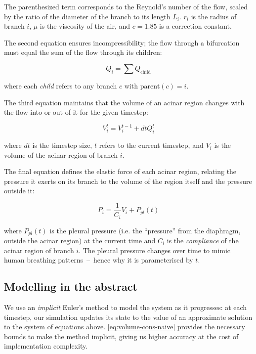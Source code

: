 The parenthesized term corresponds to the Reynold's number of the flow, scaled by the ratio of the
diameter of the branch to its length $L_i$. $r_i$ is the radius of branch $i$, $\mu$ is the
viscosity of the air, and $c = 1.85$ is a correction constant.

The second equation ensures incompressibility; the flow through a bifurcation must equal the sum of
the flow through its children:

\begin{equation}
    Q_i = \sum Q_{\text{child}}
\end{equation}

\noindent
where each \textit{child} refers to any branch $c$ with $\text{parent}(c) = i$.

The third equation maintains that the volume of an acinar region changes with the flow into or out
of it for the given timestep:

\begin{equation}
    V_i^t = V_i^{t-1} + dt Q_i^t
\end{equation}

\noindent
where $dt$ is the timestep size, $t$ refers to the current timestep, and $V_i$ is the volume of the
acinar region of branch $i$.

The final equation defines the elastic force of each acinar region, relating the pressure it exerts
on its branch to the volume of the region itself and the pressure outside it:

\begin{equation} \label{eq:volume-cons-naive}
    P_i = \frac{1}{C_i} V_i + P_{pl}(t)
\end{equation}

\noindent
where $P_{pl}(t)$ is the pleural pressure (i.e. the ``pressure'' from the diaphragm, outside the
acinar region) at the current time and $C_i$ is the \textit{compliance} of the acinar region of
branch $i$. The pleural pressure changes over time to mimic human breathing patterns~--~hence why it
is parameterised by $t$.

\subsection{Modelling in the abstract} \label{sec:modelling-in-the-abstract}

We use an \textit{implicit} Euler's method to model the system as it progresses: at each timestep,
our simulation updates its state to the value of an approximate solution to the system of equations
above. \autoref{eq:volume-cons-naive} provides the necessary bounds to make the method implicit,
giving us higher accuracy at the cost of implementation complexity.

